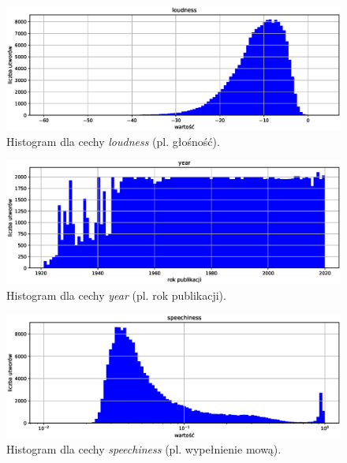\documentclass[a4paper,11pt]{article}
\begin{document}
    \smallskip

    \begin{figure}[H]
        \label{fig:loudness}
        \centering
        \includegraphics[width=\textwidth]{loudness}
        \caption{Histogram dla cechy \textit{loudness} (pl. głośność).}
    \end{figure}

    \smallskip

    \begin{figure}[H]
        \label{fig:year}
        \centering
        \includegraphics[width=\textwidth]{year}
        \caption{Histogram dla cechy \textit{year} (pl. rok publikacji).}
    \end{figure}

    \smallskip

    \begin{figure}[H]
        \label{fig:speechiness}
        \centering
        \includegraphics[width=\textwidth]{speechiness}
        \caption{Histogram dla cechy \textit{speechiness} (pl. wypełnienie mową).}
    \end{figure}
\end{document}

